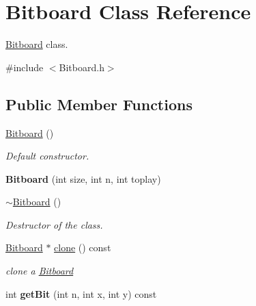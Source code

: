 \hypertarget{class_bitboard}{\section{Bitboard Class Reference}
\label{class_bitboard}
}


\hyperlink{class_bitboard}{Bitboard} class.  




{\ttfamily \#include $<$Bitboard.\+h$>$}

\subsection*{Public Member Functions}
\begin{DoxyCompactItemize}
\item 
\hyperlink{class_bitboard_adf47222b0cd401b3ec6c762a953fadf1}{Bitboard} ()
\begin{DoxyCompactList}\small\item\em Default constructor. \end{DoxyCompactList}\item 
\hypertarget{class_bitboard_a8c1ae6b5f4b54c6118e44c503238f3e4}{{\bfseries Bitboard} (int size, int n, int toplay)}\label{class_bitboard_a8c1ae6b5f4b54c6118e44c503238f3e4}

\item 
\hypertarget{class_bitboard_ad2688925653206f405e9e456c87a3142}{\hyperlink{class_bitboard_ad2688925653206f405e9e456c87a3142}{$\sim$\+Bitboard} ()}\label{class_bitboard_ad2688925653206f405e9e456c87a3142}

\begin{DoxyCompactList}\small\item\em Destructor of the class. \end{DoxyCompactList}\item 
\hypertarget{class_bitboard_a0e8d35fe97c43f0be6a3ba87182dfaa4}{\hyperlink{class_bitboard}{Bitboard} $\ast$ \hyperlink{class_bitboard_a0e8d35fe97c43f0be6a3ba87182dfaa4}{clone} () const }\label{class_bitboard_a0e8d35fe97c43f0be6a3ba87182dfaa4}

\begin{DoxyCompactList}\small\item\em clone a \hyperlink{class_bitboard}{Bitboard} \end{DoxyCompactList}\item 
\hypertarget{class_bitboard_a389593cc6921d71f5d9b15d551d3f303}{int {\bfseries get\+Bit} (int n, int x, int y) const }\label{class_bitboard_a389593cc6921d71f5d9b15d551d3f303}


\end{DoxyCompactItemize}
